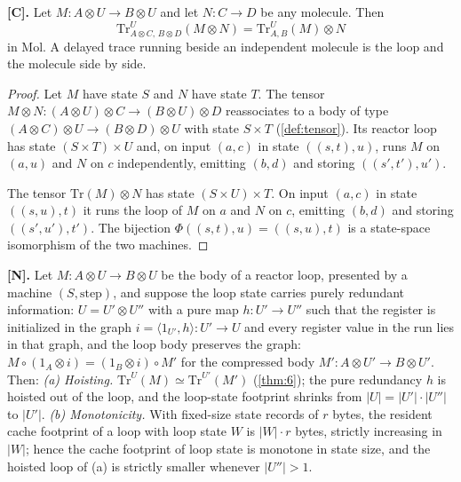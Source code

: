 \begin{theorem}\label{thm:36}
\textbf{[C].} Let $M : A \otimes U \to B \otimes U$ and let
$N : C \to D$ be any molecule. Then
\[
\mathrm{Tr}^{U}_{A \otimes C,\, B \otimes D} (M \otimes N)
= \mathrm{Tr}^{U}_{A,B} (M) \otimes N
\]
in Mol. A delayed trace running beside an independent molecule is the
loop and the molecule side by side.
\end{theorem}

\begin{proof}
Let $M$ have state $S$ and $N$ have state $T$. The tensor
$M \otimes N : (A \otimes U) \otimes C \to (B \otimes U) \otimes D$
reassociates to a body of type $(A \otimes C) \otimes U \to
(B \otimes D) \otimes U$ with state $S \times T$
(\autoref{def:tensor}). Its reactor loop has state
$(S \times T) \times U$ and, on input $(a, c)$ in state
$((s, t), u)$, runs $M$ on $(a, u)$ and $N$ on $c$ independently,
emitting $(b, d)$ and storing $((s', t'), u')$.

The tensor $\mathrm{Tr} (M) \otimes N$ has state $(S \times U) \times T$.
On input $(a, c)$ in state $((s, u), t)$ it runs the loop of $M$ on $a$
and $N$ on $c$, emitting $(b, d)$ and storing $((s', u'), t')$. The
bijection $\Phi ((s, t), u) = ((s, u), t)$ is a state-space isomorphism
of the two machines.
\end{proof}

\begin{theorem}\label{thm:37}
\textbf{[N].} Let $M : A \otimes U \to B \otimes U$ be the body of a
reactor loop, presented by a machine $(S, \mathrm{step})$, and suppose
the loop state carries purely redundant information: $U = U' \otimes U''$
with a pure map $h : U' \to U''$ such that the register is initialized
in the graph $i = \langle 1_{U'}, h\rangle : U' \to U$ and every register
value in the run lies in that graph, and the loop body preserves the
graph:
$M \circ (1_A \otimes i) = (1_B \otimes i) \circ M'$ for the compressed
body $M' : A \otimes U' \to B \otimes U'$. Then:
\emph{(a) Hoisting.} $\mathrm{Tr}^{U} (M) \simeq \mathrm{Tr}^{U'} (M')$
(\autoref{thm:6}); the pure redundancy $h$ is hoisted out of the loop, and
the loop-state footprint shrinks from $|U| = |U'| \cdot |U''|$ to $|U'|$.
\emph{(b) Monotonicity.} With fixed-size state records of $r$ bytes, the
resident cache footprint of a loop with loop state $W$ is $|W| \cdot r$
bytes, strictly increasing in $|W|$; hence the cache footprint of loop
state is monotone in state size, and the hoisted loop of (a) is strictly
smaller whenever $|U''| > 1$.
\end{theorem}

